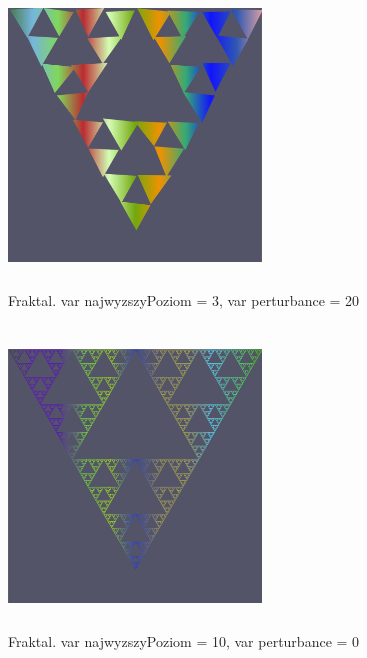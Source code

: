 \documentclass[polish,polish,a4paper]{article}
\begin{document}
    \begin{figure}[h!]
      \centering
      \includegraphics[width=0.6\textwidth,height=8cm]{fraktal1.png}
      \caption{Fraktal. var najwyzszyPoziom = 3, var perturbance = 20}
      \label{fig:zrzut1}
    \end{figure}

    \begin{figure}[h!]
      \centering
      \includegraphics[width=0.6\textwidth,height=8cm]{fraktal2.png}
      \caption{Fraktal. var najwyzszyPoziom = 10, var perturbance = 0}
      \label{fig:zrzut1}
    \end{figure}
\end{document}
